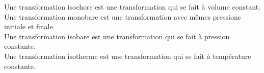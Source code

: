 \documentclass[a4paper]{article}
\begin{document}
\pagestyle{fancy}
\fancyhf{}
\setlength{\headheight}{15pt}

\begin{center}
	\large{}
\end{center}


Une transformation isochore est une transformation qui se fait à volume constant.\\
Une transformation monobare est une transformation avec mêmes pressions initiale et finale.\\
Une transformation isobare est une transformation qui se fait à pression constante.\\
Une transformation isotherme est une transformation qui se fait à température constante.
\end{document}
